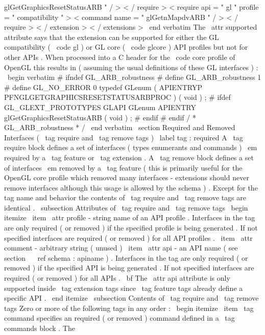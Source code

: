 glGetGraphicsResetStatusARB
"
/
>
<
/
require
>
<
require
api
=
"
gl
"
profile
=
"
compatibility
"
>
<
command
name
=
"
glGetnMapdvARB
"
/
>
<
/
require
>
<
/
extension
>
<
/
extensions
>
\
end
{
verbatim
}
The
\
attr
{
supported
}
attribute
says
that
the
extension
can
be
supported
for
either
the
GL
compatibility
(
\
code
{
gl
}
)
or
GL
core
(
\
code
{
glcore
}
)
API
profiles
but
not
for
other
APIs
.
When
processed
into
a
C
header
for
the
\
code
{
core
}
profile
of
OpenGL
this
results
in
(
assuming
the
usual
definitions
of
these
GL
interfaces
)
:
\
begin
{
verbatim
}
#
ifndef
GL_ARB_robustness
#
define
GL_ARB_robustness
1
#
define
GL_NO_ERROR
0
typedef
GLenum
(
APIENTRYP
PFNGLGETGRAPHICSRESETSTATUSARBPROC
)
(
void
)
;
#
ifdef
GL_GLEXT_PROTOTYPES
GLAPI
GLenum
APIENTRY
glGetGraphicsResetStatusARB
(
void
)
;
#
endif
#
endif
/
*
GL_ARB_robustness
*
/
\
end
{
verbatim
}
\
section
{
Required
and
Removed
Interfaces
(
\
tag
{
require
}
and
\
tag
{
remove
}
tags
)
}
\
label
{
tag
:
required
}
A
\
tag
{
require
}
block
defines
a
set
of
interfaces
(
types
enumerants
and
commands
)
{
\
em
required
}
by
a
\
tag
{
feature
}
or
\
tag
{
extension
}
.
A
\
tag
{
remove
}
block
defines
a
set
of
interfaces
{
\
em
removed
}
by
a
\
tag
{
feature
}
(
this
is
primarily
useful
for
the
OpenGL
core
profile
which
removed
many
interfaces
-
extensions
should
never
remove
interfaces
although
this
usage
is
allowed
by
the
schema
)
.
Except
for
the
tag
name
and
behavior
the
contents
of
\
tag
{
require
}
and
\
tag
{
remove
}
tags
are
identical
.
\
subsection
{
Attributes
of
\
tag
{
require
}
and
\
tag
{
remove
}
tags
}
\
begin
{
itemize
}
\
item
\
attr
{
profile
}
-
string
name
of
an
API
profile
.
Interfaces
in
the
tag
are
only
required
(
or
removed
)
if
the
specified
profile
is
being
generated
.
If
not
specified
interfaces
are
required
(
or
removed
)
for
all
API
profiles
.
\
item
\
attr
{
comment
}
-
arbitrary
string
(
unused
)
\
item
\
attr
{
api
}
-
an
API
name
(
see
section
~
\
ref
{
schema
:
apiname
}
)
.
Interfaces
in
the
tag
are
only
required
(
or
removed
)
if
the
specified
API
is
being
generated
.
If
not
specified
interfaces
are
required
(
or
removed
)
for
all
APIs
.
{
\
bf
The
\
attr
{
api
}
attribute
is
only
supported
inside
\
tag
{
extension
}
tags
}
since
\
tag
{
feature
}
tags
already
define
a
specific
API
.
\
end
{
itemize
}
\
subsection
{
Contents
of
\
tag
{
require
}
and
\
tag
{
remove
}
tags
}
Zero
or
more
of
the
following
tags
in
any
order
:
\
begin
{
itemize
}
\
item
\
tag
{
command
}
specifies
an
required
(
or
removed
)
command
defined
in
a
\
tag
{
commands
}
block
.
The
